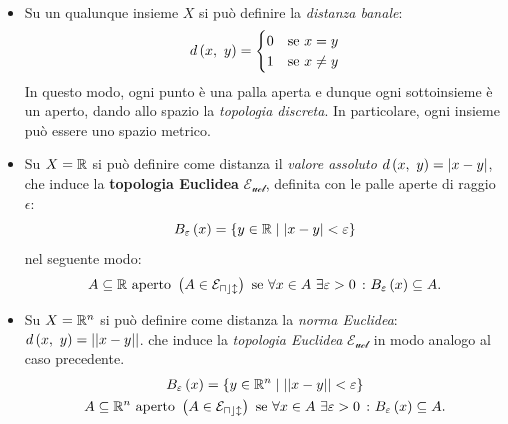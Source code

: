 \begin{example}~{}
\begin{itemize}
\item Su un qualunque insieme $X$ si può definire la \textit{distanza banale}:
\begin{equation}
d\left(x,\ y\right)=\begin{cases} 
	0 & \text{se }x=y\\
	1 & \text{se }x\neq y
\end{cases}
\end{equation}
In questo modo, ogni punto è una palla aperta e dunque ogni sottoinsieme è un aperto, dando allo spazio la \textit{topologia discreta}. In particolare, ogni insieme può essere uno spazio metrico.
\item Su $X=\mathbb{R}$ si può definire come distanza il \textit{valore assoluto} $d\left(x,\ y\right)=|x-y|$, che induce la \textbf{topologia Euclidea} $\mathcal{E_{ucl}}$, definita con le palle aperte di raggio $\epsilon$:
\begin{equation}
	B_{\varepsilon}\left(x\right)=\left\{y\in \mathbb{R}\mid |x-y|<\varepsilon\right\}
\end{equation}
nel seguente modo:
\begin{equation*}
A\subseteq \mathbb{R} \text{ aperto } \left(A\in\mathcal{E_{ucl}}\right) \text{ se } \forall x\in A\ \exists \varepsilon>0\ \colon B_{\varepsilon}\left(x\right)\subseteq A.
\end{equation*}
\item Su $X=\mathbb{R}^n$ si può definire come distanza la \textit{norma Euclidea}: $d\left(x,\ y\right)=||x-y||$. che induce la \textit{topologia Euclidea} $\mathcal{E_{ucl}}$ in modo analogo al caso precedente.
\begin{gather*}
	B_{\varepsilon}\left(x\right)=\left\{y\in \mathbb{R}^n\mid ||x-y||<\varepsilon\right\}\\
	A\subseteq \mathbb{R}^n \text{ aperto } \left(A\in\mathcal{E_{ucl}}\right) \text{ se } \forall x\in A\ \exists \varepsilon>0\ \colon B_{\varepsilon}\left(x\right)\subseteq A.
\end{gather*}
\end{itemize}
\end{example}

